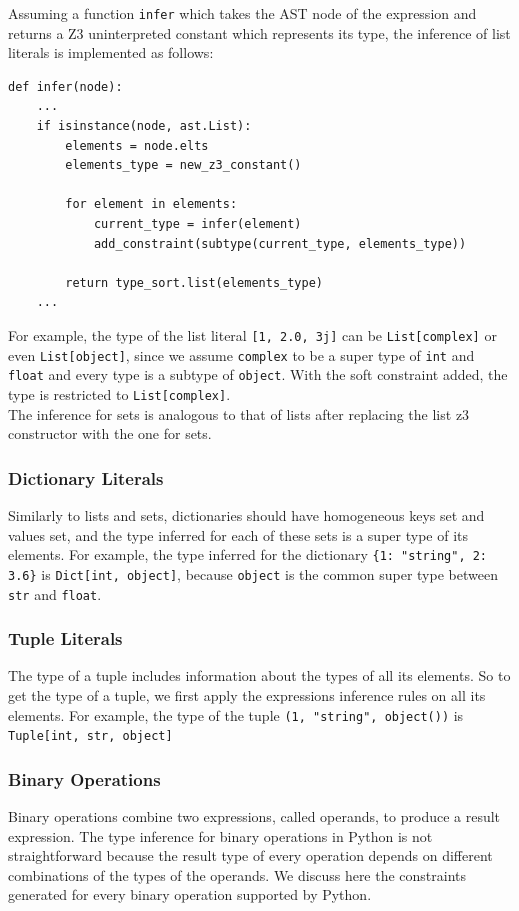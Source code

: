 Assuming a function \lstinline|infer| which takes the AST node of the expression and returns a Z3 uninterpreted constant which represents its type, the inference of list literals is implemented as follows:

\begin{lstlisting}
def infer(node):
	...
	if isinstance(node, ast.List):
		elements = node.elts
		elements_type = new_z3_constant()
		
		for element in elements:
			current_type = infer(element)
			add_constraint(subtype(current_type, elements_type))
			
		return type_sort.list(elements_type)
	...
\end{lstlisting}

For example, the type of the list literal \lstinline|[1, 2.0, 3j]| can be \lstinline|List[complex]| or even \lstinline|List[object]|, since we assume \lstinline|complex| to be a super type of \lstinline|int| and \lstinline|float| and every type is a subtype of \lstinline|object|. With the soft constraint added, the type is restricted to \lstinline|List[complex]|.\\

The inference for sets is analogous to that of lists after replacing the list z3 constructor with the one for sets.


\subsubsection{Dictionary Literals}
Similarly to lists and sets, dictionaries should have homogeneous keys set and values set, and the type inferred for each of these sets is a super type of its elements. For example, the type inferred for the dictionary \lstinline|{1: "string", 2: 3.6}| is \lstinline|Dict[int, object]|, because \lstinline|object| is the common super type between \lstinline|str| and \lstinline|float|.


\subsubsection{Tuple Literals}
The type of a tuple includes information about the types of all its elements. So to get the type of a tuple, we first apply the expressions inference rules on all its elements. For example, the type of the tuple \lstinline|(1, "string", object())| is \lstinline|Tuple[int, str, object]|

\subsubsection{Binary Operations}
Binary operations combine two expressions, called operands, to produce a result expression. The type inference for binary operations in Python is not straightforward because the result type of every operation depends on different combinations of the types of the operands. We discuss here the constraints generated for every binary operation supported by Python.\\

